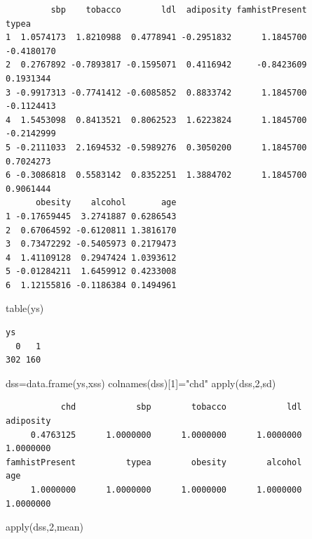 \documentclass[
  letterpaper,
  DIV=11,
  numbers=noendperiod]{scrartcl}
\newenvironment{Shaded}{\begin{snugshade}}{\end{snugshade}}
\newcommand{\DecValTok}[1]{\textcolor[rgb]{0.68,0.00,0.00}{#1}}
\newcommand{\FunctionTok}[1]{\textcolor[rgb]{0.28,0.35,0.67}{#1}}
\newcommand{\NormalTok}[1]{\textcolor[rgb]{0.00,0.23,0.31}{#1}}
\newcommand{\OtherTok}[1]{\textcolor[rgb]{0.00,0.23,0.31}{#1}}
\newcommand{\StringTok}[1]{\textcolor[rgb]{0.13,0.47,0.30}{#1}}
\begin{document}
\begin{verbatim}
         sbp    tobacco        ldl  adiposity famhistPresent      typea
1  1.0574173  1.8210988  0.4778941 -0.2951832      1.1845700 -0.4180170
2  0.2767892 -0.7893817 -0.1595071  0.4116942     -0.8423609  0.1931344
3 -0.9917313 -0.7741412 -0.6085852  0.8833742      1.1845700 -0.1124413
4  1.5453098  0.8413521  0.8062523  1.6223824      1.1845700 -0.2142999
5 -0.2111033  2.1694532 -0.5989276  0.3050200      1.1845700  0.7024273
6 -0.3086818  0.5583142  0.8352251  1.3884702      1.1845700  0.9061444
      obesity    alcohol       age
1 -0.17659445  3.2741887 0.6286543
2  0.67064592 -0.6120811 1.3816170
3  0.73472292 -0.5405973 0.2179473
4  1.41109128  0.2947424 1.0393612
5 -0.01284211  1.6459912 0.4233008
6  1.12155816 -0.1186384 0.1494961
\end{verbatim}

\begin{Shaded}
\begin{Highlighting}[]
\FunctionTok{table}\NormalTok{(ys)}
\end{Highlighting}
\end{Shaded}

\begin{verbatim}
ys
  0   1 
302 160 
\end{verbatim}

\begin{Shaded}
\begin{Highlighting}[]
\NormalTok{dss}\OtherTok{=}\FunctionTok{data.frame}\NormalTok{(ys,xss)}
\FunctionTok{colnames}\NormalTok{(dss)[}\DecValTok{1}\NormalTok{]}\OtherTok{=}\StringTok{"chd"}
\FunctionTok{apply}\NormalTok{(dss,}\DecValTok{2}\NormalTok{,sd)}
\end{Highlighting}
\end{Shaded}

\begin{verbatim}
           chd            sbp        tobacco            ldl      adiposity 
     0.4763125      1.0000000      1.0000000      1.0000000      1.0000000 
famhistPresent          typea        obesity        alcohol            age 
     1.0000000      1.0000000      1.0000000      1.0000000      1.0000000 
\end{verbatim}

\begin{Shaded}
\begin{Highlighting}[]
\FunctionTok{apply}\NormalTok{(dss,}\DecValTok{2}\NormalTok{,mean)}
\end{Highlighting}
\end{Shaded}
\end{document}
